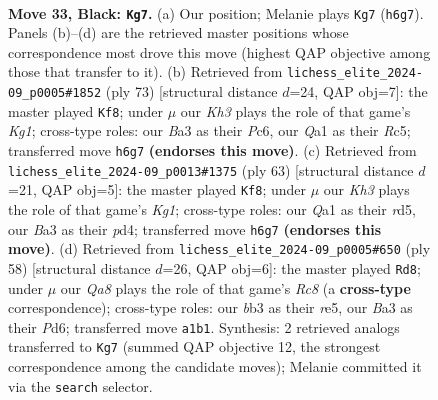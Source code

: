 \documentclass[11pt]{article}
\begin{document}
\clearpage

\begin{figure}[p]\centering
\begin{subfigure}{0.46\textwidth}\centering
\resizebox{\linewidth}{!}{%
\newchessgame
\chessboard[
  setfen={8/pp5p/6pk/8/8/bB4P1/4RPKP/q7 b - - 1 33},
  showmover=false,
  pgfstyle=straightmove, color=movearrow, markmove={h6-g7}
]}
\caption{}
\end{subfigure}\hfill
\begin{subfigure}{0.46\textwidth}\centering
\resizebox{\linewidth}{!}{%
\newchessgame
\chessboard[
  setfen={6k1/5pp1/2p4p/2r5/3R4/6P1/5PKP/8 b - - 0 37},
  showmover=false,
  pgfstyle=straightmove, color=movearrow, markmove={g8-f8}
]}
\caption{}
\end{subfigure}
\\[4pt]
\begin{subfigure}{0.46\textwidth}\centering
\resizebox{\linewidth}{!}{%
\newchessgame
\chessboard[
  setfen={6k1/5pp1/7p/3R4/p2P4/6P1/5PKP/r7 b - - 2 32},
  showmover=false,
  pgfstyle=straightmove, color=movearrow, markmove={g8-f8}
]}
\caption{}
\end{subfigure}\hfill
\begin{subfigure}{0.46\textwidth}\centering
\resizebox{\linewidth}{!}{%
\newchessgame
\chessboard[
  setfen={2R5/p2p2pk/3Pp2p/4r3/8/8/1P4PP/6K1 w - - 2 30},
  showmover=false,
  pgfstyle=straightmove, color=movearrow, markmove={c8-d8}
]}
\caption{}
\end{subfigure}
\caption{\textbf{Move 33, Black: \texttt{Kg7}.} (a) Our position; Melanie plays \texttt{Kg7} (\texttt{h6g7}). Panels (b)--(d) are the retrieved master positions whose correspondence most drove this move (highest QAP objective among those that transfer to it). (b) Retrieved from \texttt{lichess\_elite\_2024-09\_p0005\#1852} (ply 73) [structural distance $d$=24, QAP obj=7]: the master played \texttt{Kf8}; under $\mu$ our \emph{Kh3} plays the role of that game's \emph{Kg1}; cross-type roles: our \emph{B}a3 as their \emph{P}c6, our \emph{Q}a1 as their \emph{R}c5; transferred move \texttt{h6g7} \textbf{(endorses this move)}. (c) Retrieved from \texttt{lichess\_elite\_2024-09\_p0013\#1375} (ply 63) [structural distance $d$=21, QAP obj=5]: the master played \texttt{Kf8}; under $\mu$ our \emph{Kh3} plays the role of that game's \emph{Kg1}; cross-type roles: our \emph{Q}a1 as their \emph{r}d5, our \emph{B}a3 as their \emph{p}d4; transferred move \texttt{h6g7} \textbf{(endorses this move)}. (d) Retrieved from \texttt{lichess\_elite\_2024-09\_p0005\#650} (ply 58) [structural distance $d$=26, QAP obj=6]: the master played \texttt{Rd8}; under $\mu$ our \emph{Qa8} plays the role of that game's \emph{Rc8} (a \textbf{cross-type} correspondence); cross-type roles: our \emph{b}b3 as their \emph{r}e5, our \emph{B}a3 as their \emph{P}d6; transferred move \texttt{a1b1}. Synthesis: 2 retrieved analogs transferred to \texttt{Kg7} (summed QAP objective 12, the strongest correspondence among the candidate moves); Melanie committed it via the \texttt{search} selector.}
\label{fig:thought-m65}
\end{figure}
\end{document}
